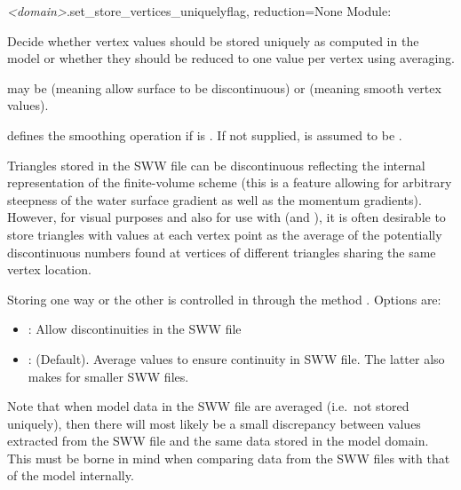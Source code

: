 \documentclass{manual}
\begin{document}
\begin{methoddesc}{\emph{<domain>}.set_store_vertices_uniquely}{flag, reduction=None}
Module: 

Decide whether vertex values should be stored uniquely as
computed in the model or whether they should be reduced to one
value per vertex using averaging.

 may be  (meaning allow surface to be discontinuous) or  (meaning smooth vertex values).

 defines the smoothing operation if  is .  If not
supplied,  is assumed to be .

Triangles stored in the SWW file can be discontinuous reflecting
the internal representation of the finite-volume scheme
(this is a feature allowing for arbitrary steepness of the water surface gradient
as well as the momentum gradients).
However, for visual purposes and also for use with 
(and ), it is often desirable to store triangles
with values at each vertex point as the average of the potentially
discontinuous numbers found at vertices of different triangles sharing the
same vertex location.

Storing one way or the other is controlled in \anuga through the method
. Options are:
\begin{itemize}
  \item {}: Allow discontinuities in the SWW file
  \item {}: (Default).
  Average values
  to ensure continuity in SWW file. The latter also makes for smaller
  SWW files.
\end{itemize}

Note that when model data in the SWW file are averaged (i.e.\ not stored uniquely),
then there will most likely be a small discrepancy between values extracted from the SWW
file and the same data stored in the model domain. This must be borne in mind when comparing
data from the SWW files with that of the model internally.
\end{methoddesc}
\end{document}
